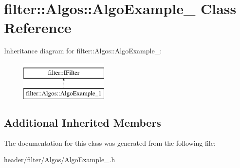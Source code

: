 \hypertarget{classfilter_1_1_algos_1_1_algo_example__1}{}\section{filter\+:\+:Algos\+:\+:Algo\+Example\+\_ Class Reference}
\label{classfilter_1_1_algos_1_1_algo_example__1}
Inheritance diagram for filter\+:\+:Algos\+:\+:Algo\+Example\+\_\+:\begin{figure}[H]
\begin{center}
\leavevmode
\includegraphics[height=2.000000cm]{d1/d3e/classfilter_1_1_algos_1_1_algo_example__1}
\end{center}
\end{figure}
\subsection*{Additional Inherited Members}


The documentation for this class was generated from the following file\+:\begin{DoxyCompactItemize}
\item 
header/filter/\+Algos/Algo\+Example\+\_.\+h\end{DoxyCompactItemize}
